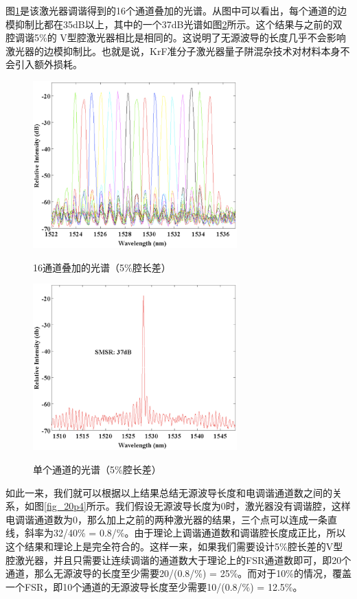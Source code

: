 \documentclass{ZJUthesis}
\begin{document}
图\ref{fig_20p2}是该激光器调谐得到的16个通道叠加的光谱。从图中可以看出，每个通道的边模抑制比都在35dB以上，其中的一个37dB光谱如图\ref{fig_20p3}所示。这个结果与之前的双腔调谐5\%的 V型腔激光器相比是相同的。这说明了无源波导的长度几乎不会影响激光器的边模抑制比。也就是说，KrF准分子激光器量子阱混杂技术对材料本身不会引入额外损耗。

\begin{figure}[!ht]
  \centering
  \includegraphics[width=0.7\textwidth]{./Pictures/20p2.eps}\\
  \caption{16通道叠加的光谱（5\%腔长差）}
  \label{fig_20p2}
\end{figure}

\begin{figure}[!ht]
  \centering
  \includegraphics[width=0.7\textwidth]{./Pictures/20p3.eps}\\
  \caption{单个通道的光谱（5\%腔长差）}
  \label{fig_20p3}
\end{figure}

如此一来，我们就可以根据以上结果总结无源波导长度和电调谐通道数之间的关系，如图\ref{fig_20p4}所示。我们假设无源波导长度为0时，激光器没有调谐腔，这样电调谐通道数为0，那么加上之前的两种激光器的结果，三个点可以连成一条直线，斜率为32/40\% = 0.8/\%。由于理论上调谐通道数和调谐腔长度成正比，所以这个结果和理论上是完全符合的。这样一来，如果我们需要设计5\%腔长差的V型腔激光器，并且只需要让连续调谐的通道数大于理论上的FSR通道数即可，即20个通道，那么无源波导的长度至少需要20/(0.8/\%) = 25\%。而对于10\%的情况，覆盖一个FSR，即10个通道的无源波导长度至少需要10/(0.8/\%) = 12.5\%。
\end{document}
